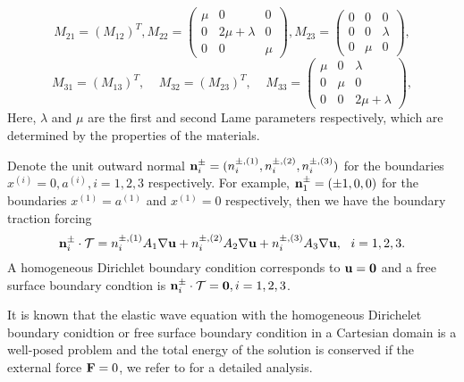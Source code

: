 \[ M_{21} =(M_{12})^T, M_{22} = \left(\begin{array}{ccc}
\mu & 0 & 0\\
0 & 2\mu+\lambda & 0\\
0 & 0 & \mu\end{array}\right), M_{23} = \left(\begin{array}{ccc}
0 & 0 & 0\\
0 & 0 & \lambda\\
0 & \mu & 0\end{array}\right),\]
\[ M_{31} = (M_{13})^T, \ \ \ \ \ M_{32} =(M_{23})^T, \ \ \ \ \ M_{33} = \left(\begin{array}{ccc}
\mu & 0 & \lambda\\
0 & \mu & 0\\
0 & 0 & 2\mu+\lambda\end{array}\right),\]
Here, $\lambda$ and $\mu$ are the first and second Lame parameters respectively, which are determined by the properties of the materials.

Denote the unit outward normal ${\bf n}_i^{\pm} = (n_i^{\pm,(1)},n_i^{\pm,(2)},n_i^{\pm,(3)})$ for the boundaries $x^{(i)} = 0, a^{(i)}, i = 1,2,3$ respectively. For example, ${\bf n}_1^{\pm} = (\pm 1, 0,0)$ for the boundaries $x^{(1)} = a^{(1)}$ and $x^{(1)} = 0$ respectively, then we have the boundary traction forcing 
\begin{equation*}
{\bf n}_i^{\pm}\cdot\mathcal{T} = n^{\pm,(1)}_iA_1\nabla{\bf u} + n^{\pm,(2)}_iA_2\nabla{\bf u} + n^{\pm,(3)}_iA_3\nabla{\bf u},\ \ i = 1,2,3.
\end{equation*}
A homogeneous Dirichlet boundary condition corresponds to ${\bf u} = {\bf 0}$ and a free surface boundary condtion is ${\bf n}_i^{\pm}\cdot\mathcal{T}  = {\bf 0}, i = 1,2,3$.

It is known that the elastic wave equation with the homogeneous Dirichelet boundary conidtion or free surface boundary condition in a Cartesian domain is a well-posed problem and the total energy of the solution is conserved if the external force ${\bf F} = 0$, we refer to \cite{?} for a detailed analysis.
